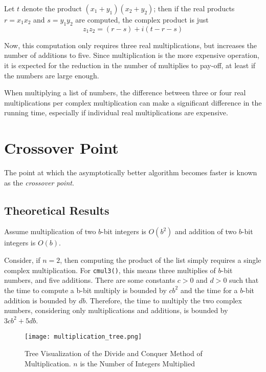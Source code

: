 \documentclass[usletter, 12pt]{article}
\begin{document}
        Let $t$ denote the product $(x_{1}+y_{1})(x_{2}+y_{2})$; then if the real products $r=x_{1}x_{2}$ and $s=y_{1}y_{2}$ are computed, the complex product is just
            \[ z_{1}z_{2}=(r-s)+i(t-r-s) \]

        Now, this computation only requires three real multiplications, but increases the number of additions to five. Since multiplication is the more expensive operation, it is expected for the reduction in the number of multiplies to pay-off, at least if the numbers are large enough.

        When multiplying a list of numbers, the difference between three or four real multiplications per complex multiplication can make a significant difference in the running time, especially if individual real multiplications are expensive.

    \section{Crossover Point}

        The point at which the asymptotically better algorithm becomes faster is known as the \textit{crossover point}.

        \subsection{Theoretical Results}
        Assume multiplication of two $b$-bit integers is $O(b^{2})$ and addition of two $b$-bit integers is $O(b)$.

        Consider, if $n = 2$, then computing the product of the list simply requires a single complex multiplication. For \texttt{cmul3()}, this means three multiplies of $b$-bit numbers, and five additions. There are some constants $c>0$ and $d>0$ such that the time to compute a b-bit multiply is bounded by $cb^2$ and the time for a $b$-bit addition is bounded by $db$.  Therefore, the time to multiply the two complex numbers, considering only multiplications and additions, is bounded by $3cb^2+5db$.

        \begin{figure}[ht]
            \begin{center}
                \texttt{[image: multiplication\_tree.png]}
                \caption{Tree Visualization of the Divide and Conquer Method of Multiplication. $n$ is the Number of Integers Multiplied} \label{multiplication_tree}
            \end{center}
        \end{figure}
\end{document}
